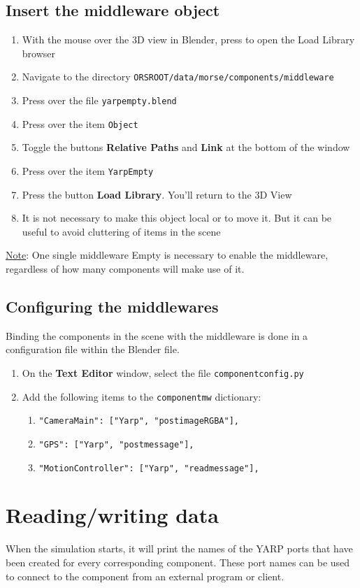 \documentclass[twoside,a4paper,10pt]{report}
\newcommand{\dokutitleleveltwo}[1]{\section{#1}}
\newcommand{\dokutitleleveltree}[1]{\subsection{#1}}
\newcommand{\dokubold}[1]{\textbf{#1}}
\newcommand{\dokumonospace}[1]{\texttt{#1}}
\newcommand{\dokuunderline}[1]{\underline{#1}}
\newcommand{\dokuitem}{\item}
\begin{document}
\dokutitleleveltree{Insert the middleware object}
\label{fc2213e90f6f9853c66c14f9f79c3379}%

\begin{enumerate}\dokuitem  With the mouse over the 3D view in Blender, press  to open the Load Library browser
\dokuitem  Navigate to the directory \dokumonospace{{\textdollar}ORS{\textunderscore}ROOT/data/morse/components/middleware}
\dokuitem  Press  over the file \dokumonospace{yarp{\textunderscore}empty.blend}
\dokuitem  Press  over the item \dokumonospace{Object}
\dokuitem  Toggle the buttons \dokubold{Relative Paths} and \dokubold{Link} at the bottom of the window
\dokuitem  Press  over the item \dokumonospace{Yarp{\textunderscore}Empty}
\dokuitem  Press the button \dokubold{Load Library}. You'll return to the 3D View
\dokuitem  It is not necessary to make this object local or to move it. But it can be useful to avoid cluttering of items in the scene 
\end{enumerate}

\dokuunderline{Note}: One single middleware Empty is necessary to enable the middleware, regardless of how many components will make use of it.


\dokutitleleveltree{Configuring the middlewares}
\label{7c1b9786b6402b908e3042548cd3c1c6}%
Binding the components in the scene with the middleware is done in a configuration file within the Blender file.



\begin{enumerate}\dokuitem  On the \dokubold{Text Editor} window, select the file \dokumonospace{component{\textunderscore}config.py}
\dokuitem  Add the following items to the \dokumonospace{component{\textunderscore}mw} dictionary:
\begin{enumerate}\dokuitem  \dokumonospace{"CameraMain": ["Yarp", "post{\textunderscore}image{\textunderscore}RGBA"],}
\dokuitem  \dokumonospace{"GPS": ["Yarp", "post{\textunderscore}message"],}
\dokuitem  \dokumonospace{"Motion{\textunderscore}Controller": ["Yarp", "read{\textunderscore}message"],}
\end{enumerate}

\end{enumerate}

\dokutitleleveltwo{Reading/writing data}
\label{4531cd1c3fba04d65475a4caadd2beb1}%

When the simulation starts, it will print the names of the YARP ports that have been created for every corresponding component. These port names can be used to connect to the component from an external program or client.
\end{document}
